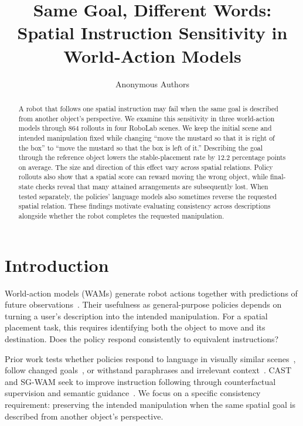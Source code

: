 \documentclass{article}
\title{Same Goal, Different Words:\\Spatial Instruction Sensitivity in World-Action Models}
\author{Anonymous Authors}
\begin{document}
\maketitle
\begin{abstract}
A robot that follows one spatial instruction may fail when the same goal is described from another object's perspective. We examine this sensitivity in three world-action models through 864 rollouts in four RoboLab scenes. We keep the initial scene and intended manipulation fixed while changing ``move the mustard so that it is right of the box'' to ``move the mustard so that the box is left of it.'' Describing the goal through the reference object lowers the stable-placement rate by 12.2 percentage points on average. The size and direction of this effect vary across spatial relations. Policy rollouts also show that a spatial score can reward moving the wrong object, while final-state checks reveal that many attained arrangements are subsequently lost. When tested separately, the policies' language models also sometimes reverse the requested spatial relation. These findings motivate evaluating consistency across descriptions alongside whether the robot completes the requested manipulation.

\end{abstract}

\setlength{\parskip}{2.5pt}
\setlength{\intextsep}{8pt plus 2pt minus 2pt}
\setlength{\textfloatsep}{12pt plus 2pt minus 2pt}
\section{Introduction}
World-action models (WAMs) generate robot actions together with predictions of future observations~\citep{kim2026cosmospolicy}. Their usefulness as general-purpose policies depends on turning a user's description into the intended manipulation. For a spatial placement task, this requires identifying both the object to move and its destination. Does the policy respond consistently to equivalent instructions?

Prior work tests whether policies respond to language in visually similar scenes~\citep{tri2025lbm}, follow changed goals~\citep{fang2026counterfactual}, or withstand paraphrases and irrelevant context~\citep{fei2026liberoplus,kim2026liberopara,moskalenko2026bring}. CAST and SG-WAM seek to improve instruction following through counterfactual supervision and semantic guidance~\citep{glossop2025cast,he2026sgwam}. We focus on a specific consistency requirement: preserving the intended manipulation when the same spatial goal is described from another object's perspective.
\end{document}
